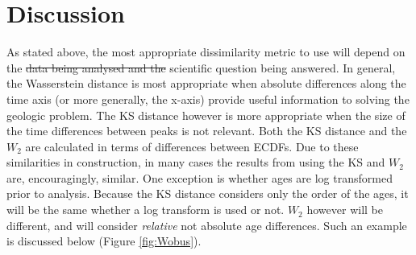 \documentclass[gchron, manuscript]{copernicus}
\providecommand{\DIFdeltex}[1]{{\protect\color{red}\sout{#1}}}                      %
\providecommand{\DIFdelbegin}{} %
\providecommand{\DIFdelend}{} %
\providecommand{\DIFdel}[1]{\texorpdfstring{\DIFdeltex{#1}}{}} %
\begin{document}

\section{Discussion}

As stated above, the most appropriate dissimilarity metric to use will depend on the \DIFdelbegin \DIFdel{data being analysed and the }\DIFdelend scientific question being answered. In general, the Wasserstein distance is most appropriate when absolute differences along the time axis (or more generally, the x-axis) provide useful information to solving the geologic problem. The KS distance however is more appropriate when the size of the time differences between peaks is not relevant. Both the KS distance and the $W_2$ are calculated in terms of differences between ECDFs. Due to these similarities in construction, in many cases the results from using the KS and $W_2$ are, encouragingly, similar. One exception is whether ages are log transformed prior to analysis. Because the KS distance considers only the order of the ages, it will be the same whether a log transform is used or not. $W_2$ however will be different, and will consider \textit{relative} not absolute age differences.  Such an example is discussed below (Figure \ref{fig:Wobus}). 
\end{document}
